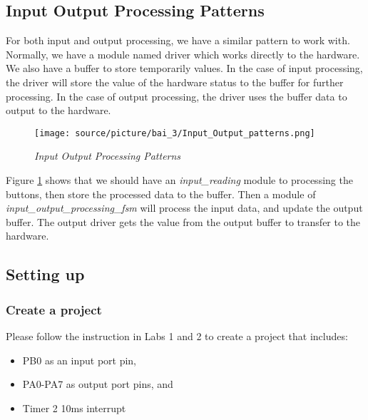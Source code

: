 \subsection{Input Output Processing Patterns}
For both input and output processing, we have a similar pattern to work with. Normally, we have a module named driver which works directly to the hardware. We also have a buffer to store temporarily values. In the case of input processing, the driver will store the value of the hardware status to the buffer for further processing. In the case of output processing, the driver uses the buffer data to output to the hardware. 

\begin{figure}[!htp]
    \centering
    \texttt{[image: source/picture/bai\_3/Input\_Output\_patterns.png]}
    \caption{\textit{Input Output Processing Patterns}}
    \label{bai4_pic_Input_Output_patterns}
\end{figure}

Figure \ref{bai4_pic_Input_Output_patterns} shows that we should have an \emph{input\_reading} module to processing the buttons, then store the processed data to the buffer. Then a module of \emph{input\_output\_processing\_fsm} will process the input data, and update the output buffer. The output driver gets the value from the output buffer to transfer to the hardware. 
\newpage
\subsection{Setting up}
\subsubsection{Create a project}
Please follow the instruction in Labs 1 and 2 to create a project that includes: 
\begin{itemize}
    \item PB0 as an input port pin, 
    \item PA0-PA7 as output port pins, and 
    \item Timer 2 10ms interrupt
\end{itemize}



